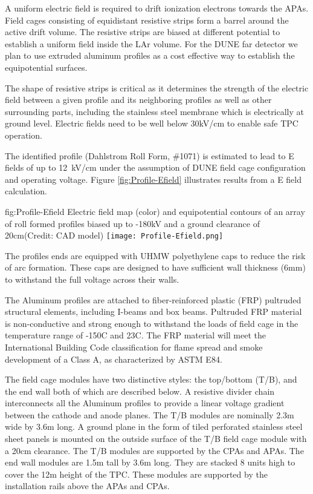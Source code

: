 A uniform electric field is required to drift ionization electrons towards the APAs. Field cages consisting of equidistant resistive strips form a barrel 
around the active drift volume. The resistive strips are biased at different potential to establish a uniform field inside the LAr volume.
For the DUNE far detector we plan to use extruded aluminum profiles as a cost effective way to establish the equipotential surfaces. 

The shape of resistive strips is critical as it determines the strength of the electric field between a given profile and its neighboring profiles as well as
other surrounding parts, including the stainless steel membrane which is electrically at ground level. Electric fields need to be well below 30kV/cm 
to enable safe TPC operation.

The identified profile (Dahlstrom Roll Form, \#1071) is estimated to lead to E fields of up to 12~kV/cm under the assumption of DUNE field cage configuration 
and operating voltage. Figure \ref{fig:Profile-Efield} illustrates results from a E field calculation.

\begin{dunefigure}
{fig:Profile-Efield}
{Electric field map (color) and equipotential contours of an array of roll formed profiles biased up to -180kV and a ground clearance of 20cm(Credit: CAD model)} \texttt{[image: Profile-Efield.png]}
\end{dunefigure}

The profiles ends are equipped with UHMW polyethylene caps to reduce the risk of arc formation.  These caps are designed to have sufficient wall thickness (6mm) to withstand the full voltage across their walls.

The Aluminum profiles are attached to fiber-reinforced plastic (FRP) pultruded structural elements, including I-beams and box beams.  
Pultruded FRP material is non-conductive and strong enough to withstand the loads of field cage in the temperature range of -150C and 23C.
The FRP material will meet the International Building Code classification for flame spread and smoke development of a Class A, as characterized by ASTM E84.  


The field cage modules have two distinctive styles: the top/bottom (T/B), and the end wall both of which are described below. 
A resistive divider chain interconnects all the Aluminum profiles to provide a linear voltage gradient between the cathode and anode planes.  The T/B modules are nominally 2.3m wide by 3.6m long. A ground plane in the form of tiled perforated stainless steel sheet panels is mounted on the outside surface of the T/B field cage module with a 20cm clearance. The T/B modules are supported by the CPAs and APAs. The end wall modules are 1.5m tall by 3.6m long. They are stacked 8 units high to cover the 12m height of the TPC.  These modules are supported by the installation rails above the APAs and CPAs.   


